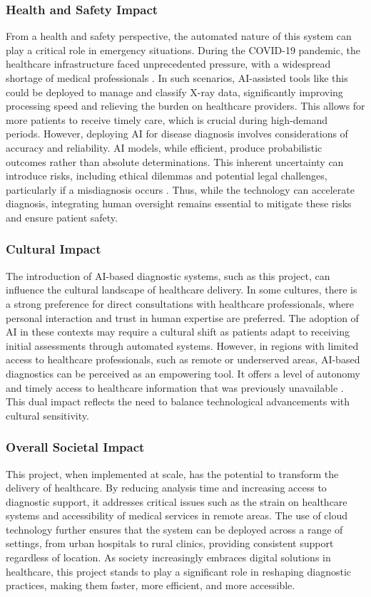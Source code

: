 \documentclass[12pt]{article}
\begin{document}
\subsubsection{Health and Safety Impact}
From a health and safety perspective, the automated nature of this system can play a critical role in emergency situations. During the COVID-19 pandemic, the healthcare infrastructure faced unprecedented pressure, with a widespread shortage of medical professionals \cite{4}. In such scenarios, AI-assisted tools like this could be deployed to manage and classify X-ray data, significantly improving processing speed and relieving the burden on healthcare providers. This allows for more patients to receive timely care, which is crucial during high-demand periods.
\newline
However, deploying AI for disease diagnosis involves considerations of accuracy and reliability. AI models, while efficient, produce probabilistic outcomes rather than absolute determinations. This inherent uncertainty can introduce risks, including ethical dilemmas and potential legal challenges, particularly if a misdiagnosis occurs \cite{5}. Thus, while the technology can accelerate diagnosis, integrating human oversight remains essential to mitigate these risks and ensure patient safety.

\subsubsection{Cultural Impact}
The introduction of AI-based diagnostic systems, such as this project, can influence the cultural landscape of healthcare delivery. In some cultures, there is a strong preference for direct consultations with healthcare professionals, where personal interaction and trust in human expertise are preferred. The adoption of AI in these contexts may require a cultural shift as patients adapt to receiving initial assessments through automated systems. However, in regions with limited access to healthcare professionals, such as remote or underserved areas, AI-based diagnostics can be perceived as an empowering tool. It offers a level of autonomy and timely access to healthcare information that was previously unavailable \cite{6}. This dual impact reflects the need to balance technological advancements with cultural sensitivity.

\subsubsection{Overall Societal Impact}
This project, when implemented at scale, has the potential to transform the delivery of healthcare. By reducing analysis time and increasing access to diagnostic support, it addresses critical issues such as the strain on healthcare systems and accessibility of medical services in remote areas. The use of cloud technology further ensures that the system can be deployed across a range of settings, from urban hospitals to rural clinics, providing consistent support regardless of location. As society increasingly embraces digital solutions in healthcare, this project stands to play a significant role in reshaping diagnostic practices, making them faster, more efficient, and more accessible.
\end{document}
